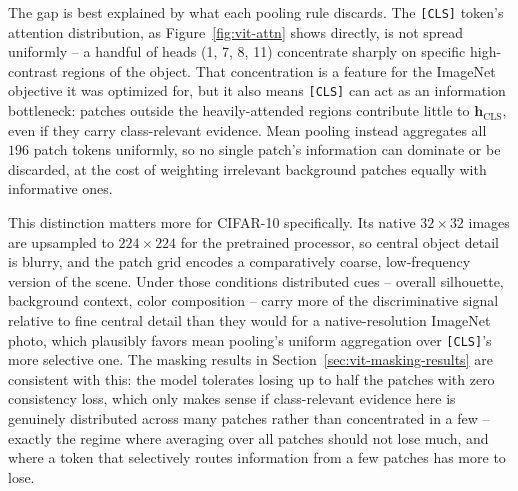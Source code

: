 The gap is best explained by what each pooling rule discards. The
\texttt{[CLS]} token's attention distribution, as Figure~\ref{fig:vit-attn}
shows directly, is not spread uniformly -- a handful of heads (1, 7, 8, 11)
concentrate sharply on specific high-contrast regions of the object. That
concentration is a feature for the ImageNet objective it was optimized
for, but it also means \texttt{[CLS]} can act as an information
bottleneck: patches outside the heavily-attended regions contribute little
to $\mathbf{h}_{\text{CLS}}$, even if they carry class-relevant evidence.
Mean pooling instead aggregates all $196$ patch tokens uniformly, so no
single patch's information can dominate or be discarded, at the cost of
weighting irrelevant background patches equally with informative ones.

This distinction matters more for CIFAR-10 specifically. Its native
$32\times32$ images are upsampled to $224\times224$ for the pretrained
processor, so central object detail is blurry, and the patch grid encodes a
comparatively coarse, low-frequency version of the scene. Under those
conditions distributed cues -- overall silhouette, background context,
color composition -- carry more of the discriminative signal relative to
fine central detail than they would for a native-resolution ImageNet photo,
which plausibly favors mean pooling's uniform aggregation over
\texttt{[CLS]}'s more selective one. The masking results in
Section~\ref{sec:vit-masking-results} are consistent with this: the model tolerates losing up to
half the patches with zero consistency loss, which only makes sense if
class-relevant evidence here is genuinely distributed across many patches
rather than concentrated in a few -- exactly the regime where averaging
over all patches should not lose much, and where a token that selectively
routes information from a few patches has more to lose.

